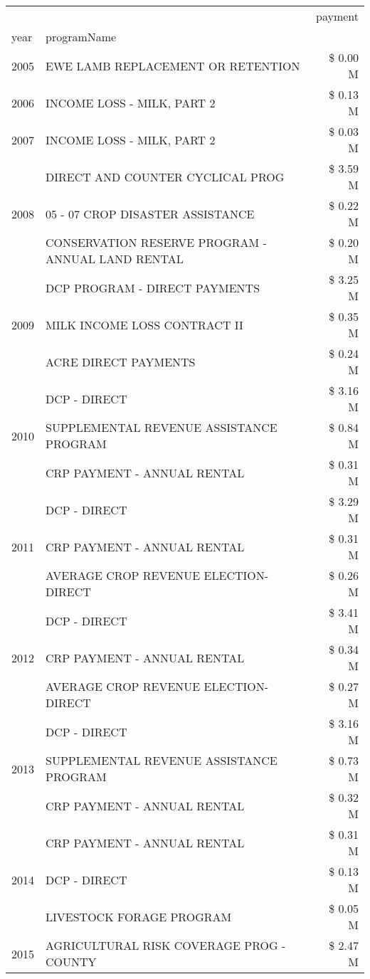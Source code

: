 \begin{tabular}{llr}
\toprule
 &  & payment \\
year & programName &  \\
\midrule
2005 & EWE LAMB REPLACEMENT OR RETENTION & \$ 0.00 M \\
\cline{1-3}
2006 & INCOME LOSS - MILK, PART 2 & \$ 0.13 M \\
\cline{1-3}
2007 & INCOME LOSS - MILK, PART 2 & \$ 0.03 M \\
\cline{1-3}
\multirow[t]{3}{*}{2008} & DIRECT AND COUNTER CYCLICAL PROG & \$ 3.59 M \\
 & 05 - 07 CROP DISASTER ASSISTANCE & \$ 0.22 M \\
 & CONSERVATION RESERVE PROGRAM - ANNUAL LAND RENTAL & \$ 0.20 M \\
\cline{1-3}
\multirow[t]{3}{*}{2009} & DCP PROGRAM - DIRECT PAYMENTS & \$ 3.25 M \\
 & MILK INCOME LOSS CONTRACT II & \$ 0.35 M \\
 & ACRE DIRECT PAYMENTS & \$ 0.24 M \\
\cline{1-3}
\multirow[t]{3}{*}{2010} & DCP - DIRECT & \$ 3.16 M \\
 & SUPPLEMENTAL REVENUE ASSISTANCE PROGRAM & \$ 0.84 M \\
 & CRP PAYMENT - ANNUAL RENTAL & \$ 0.31 M \\
\cline{1-3}
\multirow[t]{3}{*}{2011} & DCP - DIRECT & \$ 3.29 M \\
 & CRP PAYMENT - ANNUAL RENTAL & \$ 0.31 M \\
 & AVERAGE CROP REVENUE ELECTION-DIRECT & \$ 0.26 M \\
\cline{1-3}
\multirow[t]{3}{*}{2012} & DCP - DIRECT & \$ 3.41 M \\
 & CRP PAYMENT - ANNUAL RENTAL & \$ 0.34 M \\
 & AVERAGE CROP REVENUE ELECTION-DIRECT & \$ 0.27 M \\
\cline{1-3}
\multirow[t]{3}{*}{2013} & DCP - DIRECT & \$ 3.16 M \\
 & SUPPLEMENTAL REVENUE ASSISTANCE PROGRAM & \$ 0.73 M \\
 & CRP PAYMENT - ANNUAL RENTAL & \$ 0.32 M \\
\cline{1-3}
\multirow[t]{3}{*}{2014} & CRP PAYMENT - ANNUAL RENTAL & \$ 0.31 M \\
 & DCP - DIRECT & \$ 0.13 M \\
 & LIVESTOCK FORAGE PROGRAM & \$ 0.05 M \\
\cline{1-3}
\multirow[t]{3}{*}{2015} & AGRICULTURAL RISK COVERAGE PROG - COUNTY & \$ 2.47 M \\

\end{tabular}
